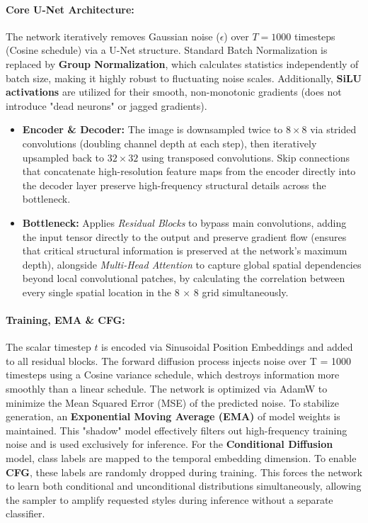 \documentclass[runningheads]{llncs}
\begin{document}
\paragraph{\normalfont\textbf{Core U-Net Architecture:}}
The network iteratively removes Gaussian noise ($\epsilon$) over $T=1000$ timesteps (Cosine schedule) via a U-Net structure. Standard Batch Normalization is replaced by \textbf{Group Normalization}, which calculates statistics independently of batch size, making it highly robust to fluctuating noise scales. Additionally, \textbf{SiLU activations} are utilized for their smooth, non-monotonic gradients (does not introduce "dead neurons" or jagged gradients).
\begin{itemize}
    \item \textbf{Encoder \& Decoder:} The image is downsampled twice to $8 \times 8$ via strided convolutions (doubling channel depth at each step), then iteratively upsampled back to $32 \times 32$ using transposed convolutions. Skip connections that concatenate high-resolution feature maps from the encoder directly into the decoder layer preserve high-frequency structural details across the bottleneck.
    \item \textbf{Bottleneck:} Applies \textit{Residual Blocks} to bypass main convolutions, adding the input tensor directly to the output and preserve gradient flow (ensures that critical structural information is preserved at the network’s maximum depth), alongside \textit{Multi-Head Attention} to capture global spatial dependencies beyond local convolutional patches, by calculating the correlation between every single spatial location in the 8 × 8 grid simultaneously.
\end{itemize}


\paragraph{\normalfont\textbf{Training, EMA \& CFG:}}
The scalar timestep $t$ is encoded via Sinusoidal Position Embeddings and added to all residual blocks. The forward diffusion process injects noise over T = 1000 timesteps using a Cosine variance schedule,
which destroys information more smoothly than a linear schedule. The network is optimized via AdamW to minimize the Mean Squared Error (MSE) of the predicted noise. To stabilize generation, an \textbf{Exponential Moving Average (EMA)} of model weights is maintained. This "shadow" model effectively filters out high-frequency training noise and is used exclusively for inference.
For the \textbf{Conditional Diffusion} model, class labels are mapped to the temporal embedding dimension. To enable \textbf{CFG}, these labels are randomly dropped during training. This forces the network to learn both conditional and unconditional distributions simultaneously, allowing the sampler to amplify requested styles during inference without a separate classifier.
\end{document}

